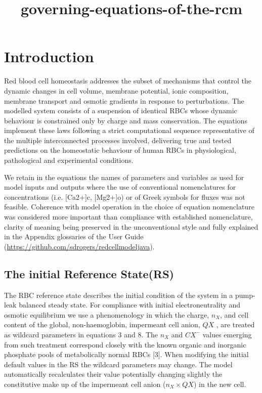 \documentclass[a4paper]{article}
\title{governing-equations-of-the-rcm}
\newcommand{\cell}[1]{C#1}
\newcommand{\nX}{n_{X}}
\newcommand{\CXm}{\cell{X^{-}}}
\newcommand{\QX}{QX}
\begin{document}
\maketitle

\section{Introduction}\label{introduction}

Red blood cell homeostasis addresses the subset of mechanisms that
control the dynamic changes in cell volume, membrane potential, ionic
composition, membrane transport and osmotic gradients in response to
perturbations. The modelled system consists of a suspension of identical
RBCs whose dynamic behaviour is constrained only by charge and mass
conservation. The equations implement these laws following a strict
computational sequence representative of the multiple interconnected
processes involved, delivering true and tested predictions on the
homeostatic behaviour of human RBCs in physiological, pathological and
experimental conditions.

We retain in the equations the names of parameters and variables as used for model inputs and outputs where the use of conventional nomenclatures for concentrations (i.e. [Ca2+]c, [Mg2+]o) or of Greek symbols for fluxes was not feasible.  Coherence with model operation in the choice of equation nomenclature was considered more important than compliance with established nomenclature, clarity of meaning being preserved in the unconventional style and fully explained in the Appendix glossaries of the User Guide (\url{https://github.com/sdrogers/redcellmodeljava}).


\subsection{The initial Reference State(RS)}

The RBC reference state describes the initial condition of the system in
a pump-leak balanced steady state. For compliance with initial
electroneutrality and osmotic equilibrium we use a phenomenology in
which the charge, $\nX$, and cell content of the global, non-haemoglobin,
impermeant cell anion, $\QX$ , are treated as wildcard parameters in
equations 3 and 8. The $\nX$ and $\CXm$ values emerging from such treatment
correspond closely with the known organic and inorganic phosphate pools
of metabolically normal RBCs {[}3{]}. When modifying the initial default
values in the RS the wildcard parameters may change. The model
automatically recalculates their value potentially changing slightly the
constitutive make up of the impermeant cell anion ($\nX \times \QX$) in
the new cell.
\end{document}
